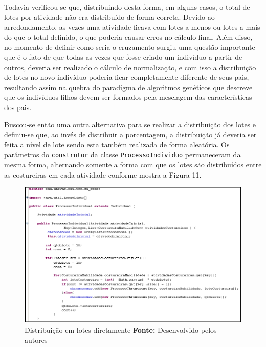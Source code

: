  \par Todavia verificou-se que, distribuindo desta forma, em alguns casos, o total de lotes por atividade não era distribuído
 de forma correta. Devido ao arredondamento, as vezes uma atividade ficava com lotes a menos ou lotes a mais do que o total
 definido, o que poderia causar erros no cálculo final. Além disso, no momento de definir como seria o cruzamento 
 surgiu uma questão importante que é o fato de que todas as vezes que fosse criado um indivíduo a partir de outros, deveria
 ser realizado o cálculo de normalização, e com isso a distribuição de lotes no novo indivíduo poderia ficar completamente
 diferente de seus pais, resultando assim na quebra do paradigma de algoritmos genéticos que descreve que os indivíduos filhos
 devem ser formados pela mesclagem das características dos pais. 


\par Buscou-se então uma outra alternativa para se realizar a distribuição dos lotes e definiu-se que, ao invés de distribuir
a porcentagem, a distribuição já deveria ser feita a nível de lote sendo esta também realizada de forma aleatória. Os parâmetros
do \texttt{construtor} da classe \texttt{ProcessoIndividuo} permaneceram da mesma forma, alternando somente a forma com que 
os lotes são distribuídos entre as costureiras em cada atividade conforme mostra a Figura 11.

\begin{figure}[h!]
	\centerline{\includegraphics[scale=0.7]{./imagens/tentativa_2_individual.png}}
	\caption[Distribuição de lotes]
	{Distribuição em lotes diretamente \textbf{Fonte:} Desenvolvido pelos autores}
	\label{fig:exemplo1}
\end{figure}

